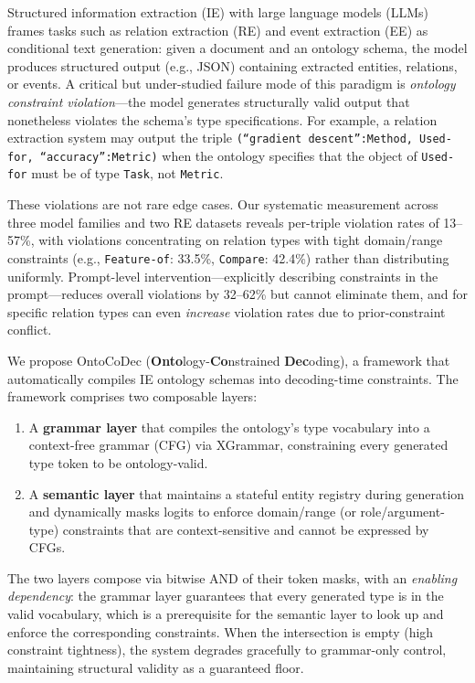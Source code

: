 \documentclass[11pt]{article}
\newcommand{\sys}{OntoCoDec}
\begin{document}
Structured information extraction (IE) with large language models (LLMs) frames tasks such as relation extraction (RE) and event extraction (EE) as conditional text generation: given a document and an ontology schema, the model produces structured output (e.g., JSON) containing extracted entities, relations, or events.
A critical but under-studied failure mode of this paradigm is \emph{ontology constraint violation}---the model generates structurally valid output that nonetheless violates the schema's type specifications.
For example, a relation extraction system may output the triple \texttt{(``gradient descent'':Method, Used-for, ``accuracy'':Metric)} when the ontology specifies that the object of \texttt{Used-for} must be of type \texttt{Task}, not \texttt{Metric}.

These violations are not rare edge cases.
Our systematic measurement across three model families and two RE datasets reveals per-triple violation rates of 13--57\%, with violations concentrating on relation types with tight domain/range constraints (e.g., \texttt{Feature-of}: 33.5\%, \texttt{Compare}: 42.4\%) rather than distributing uniformly.
Prompt-level intervention---explicitly describing constraints in the prompt---reduces overall violations by 32--62\% but cannot eliminate them, and for specific relation types can even \emph{increase} violation rates due to prior-constraint conflict.

We propose \sys{} (\textbf{Onto}logy-\textbf{Co}nstrained \textbf{Dec}oding), a framework that automatically compiles IE ontology schemas into decoding-time constraints.
The framework comprises two composable layers:
\begin{enumerate}[nosep,leftmargin=*]
\item A \textbf{grammar layer} that compiles the ontology's type vocabulary into a context-free grammar (CFG) via XGrammar, constraining every generated type token to be ontology-valid.
\item A \textbf{semantic layer} that maintains a stateful entity registry during generation and dynamically masks logits to enforce domain/range (or role/argument-type) constraints that are context-sensitive and cannot be expressed by CFGs.
\end{enumerate}
The two layers compose via bitwise AND of their token masks, with an \emph{enabling dependency}: the grammar layer guarantees that every generated type is in the valid vocabulary, which is a prerequisite for the semantic layer to look up and enforce the corresponding constraints.
When the intersection is empty (high constraint tightness), the system degrades gracefully to grammar-only control, maintaining structural validity as a guaranteed floor.
\end{document}
